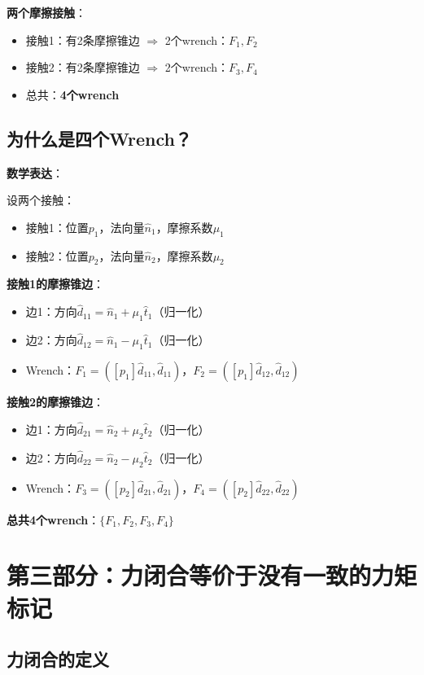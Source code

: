\documentclass[12pt,a4paper]{article}
\begin{document}
\textbf{两个摩擦接触}：
\begin{itemize}
\item 接触1：有2条摩擦锥边 $\Rightarrow$ 2个wrench：$F_1, F_2$
\item 接触2：有2条摩擦锥边 $\Rightarrow$ 2个wrench：$F_3, F_4$
\item 总共：\textbf{4个wrench}
\end{itemize}

\subsection{为什么是四个Wrench？}

\textbf{数学表达}：

设两个接触：
\begin{itemize}
\item 接触1：位置$p_1$，法向量$\hat{n}_1$，摩擦系数$\mu_1$
\item 接触2：位置$p_2$，法向量$\hat{n}_2$，摩擦系数$\mu_2$
\end{itemize}

\textbf{接触1的摩擦锥边}：
\begin{itemize}
\item 边1：方向$\hat{d}_{11} = \hat{n}_1 + \mu_1 \hat{t}_1$（归一化）
\item 边2：方向$\hat{d}_{12} = \hat{n}_1 - \mu_1 \hat{t}_1$（归一化）
\item Wrench：$F_1 = ([p_1] \hat{d}_{11}, \hat{d}_{11})$，$F_2 = ([p_1] \hat{d}_{12}, \hat{d}_{12})$
\end{itemize}

\textbf{接触2的摩擦锥边}：
\begin{itemize}
\item 边1：方向$\hat{d}_{21} = \hat{n}_2 + \mu_2 \hat{t}_2$（归一化）
\item 边2：方向$\hat{d}_{22} = \hat{n}_2 - \mu_2 \hat{t}_2$（归一化）
\item Wrench：$F_3 = ([p_2] \hat{d}_{21}, \hat{d}_{21})$，$F_4 = ([p_2] \hat{d}_{22}, \hat{d}_{22})$
\end{itemize}

\textbf{总共4个wrench}：$\{F_1, F_2, F_3, F_4\}$

\section{第三部分：力闭合等价于没有一致的力矩标记}

\subsection{力闭合的定义}
\end{document}
